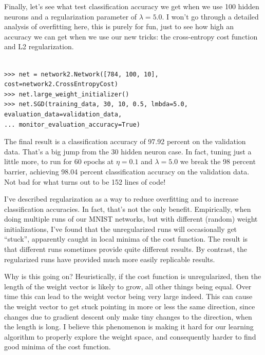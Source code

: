 \documentclass[a4paper,twoside,10pt]{book}
\begin{document}
Finally, let's see what test classification accuracy we get when we use 100 hidden neurons and a regularization parameter of $\lambda =5.0$. I won't go through a detailed analysis of overfitting here, this is purely for fun, just to see how high an accuracy we can get when we use our new tricks: the cross-entropy cost function and L2 regularization.

\begin{lstlisting}

>>> net = network2.Network([784, 100, 10], cost=network2.CrossEntropyCost)
>>> net.large_weight_initializer()
>>> net.SGD(training_data, 30, 10, 0.5, lmbda=5.0, evaluation_data=validation_data,
... monitor_evaluation_accuracy=True)

\end{lstlisting}
The final result is a classification accuracy of 97.92 percent on the validation data. That's a big jump from the 30 hidden neuron case. In fact, tuning just a little more, to run for 60 epochs at $\eta=0.1$ and $\lambda =5.0$ we break the 98 percent barrier, achieving 98.04 percent classification accuracy on the validation data. Not bad for what turns out to be 152 lines of code!

I've described regularization as a way to reduce overfitting and to increase classification accuracies. In fact, that's not the only benefit. Empirically, when doing multiple runs of our MNIST networks, but with different (random) weight initializations, I've found that the unregularized runs will occasionally get ``stuck'', apparently caught in local minima of the cost function. The result is that different runs sometimes provide quite different results. By contrast, the regularized runs have provided much more easily replicable results.

Why is this going on? Heuristically, if the cost function is unregularized, then the length of the weight vector is likely to grow, all other things being equal. Over time this can lead to the weight vector being very large indeed. This can cause the weight vector to get stuck pointing in more or less the same direction, since changes due to gradient descent only make tiny changes to the direction, when the length is long. I believe this phenomenon is making it hard for our learning algorithm to properly explore the weight space, and consequently harder to find good minima of the cost function.
\end{document}

